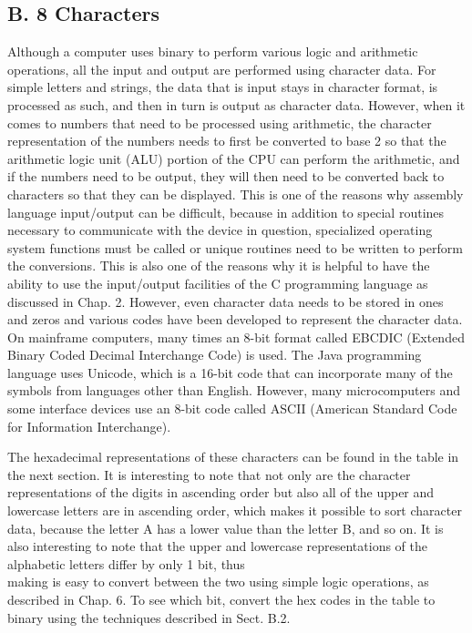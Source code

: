 \documentclass[10pt]{book}
\begin{document}
\begin{center}
\begin{center}
\begin{center}
\begin{center}
\begin{center}
\section*{B. 8 Characters}
Although a computer uses binary to perform various logic and arithmetic operations, all the input and output are performed using character data. For simple letters and strings, the data that is input stays in character format, is processed as such, and then in turn is output as character data. However, when it comes to numbers that need to be processed using arithmetic, the character representation of the numbers needs to first be converted to base 2 so that the arithmetic logic unit (ALU) portion of the CPU can perform the arithmetic, and if the numbers need to be output, they will then need to be converted back to characters so that they can be displayed. This is one of the reasons why assembly language input/output can be difficult, because in addition to special routines necessary to communicate with the device in question, specialized operating system functions must be called or unique routines need to be written to perform the conversions. This is also one of the reasons why it is helpful to have the ability to use the input/output facilities of the C programming language as discussed in Chap. 2. However, even character data needs to be stored in ones and zeros and various codes have been developed to represent the character data. On mainframe computers, many times an 8-bit format called EBCDIC (Extended Binary Coded Decimal Interchange Code) is used. The Java programming language uses Unicode, which is a 16-bit code that can incorporate many of the symbols from languages other than English. However, many microcomputers and some interface devices use an 8-bit code called ASCII (American Standard Code for Information Interchange).

The hexadecimal representations of these characters can be found in the table in the next section. It is interesting to note that not only are the character representations of the digits in ascending order but also all of the upper and lowercase letters are in ascending order, which makes it possible to sort character data, because the letter A has a lower value than the letter B, and so on. It is also interesting to note that the upper and lowercase representations of the alphabetic letters differ by only 1 bit, thus\\
making is easy to convert between the two using simple logic operations, as described in Chap. 6. To see which bit, convert the hex codes in the table to binary using the techniques described in Sect. B.2.


\end{center}
\end{center}
\end{center}
\end{center}
\end{center}
\end{document}

